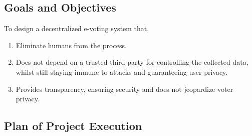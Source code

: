 \documentclass[oneside, 12pt]{book}
\begin{document}
\subsection{Goals and Objectives}
To design a decentralized e-voting system that,
\begin{enumerate}
	\item Eliminate humans from the process.
	\item Does not depend on a trusted third party for controlling the collected data, whilst still staying immune to attacks and guaranteeing user privacy.
	\item Provides transparency, ensuring security and does not jeopardize voter privacy.
\end{enumerate}
\subsection{Plan of Project Execution}
\end{document}
